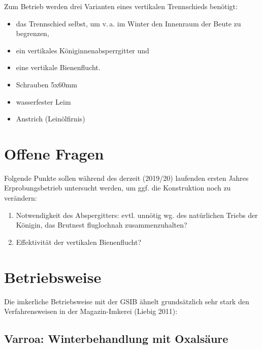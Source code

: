 \documentclass[12pt,a4paper,ngerman]{scrartcl}
\begin{document}
Zum Betrieb werden drei Varianten eines vertikalen Trennschieds benötigt:

\begin{itemize}
\item das Trennschied selbst, um v.\,a. im Winter den Innenraum der Beute zu begrenzen,
\item ein vertikales Königinnenabsperrgitter und
\item eine vertikale Bienenflucht.
\end{itemize}



\begin{itemize}
\item Schrauben 5x60mm
\item wasserfester Leim
\item Anstrich (Leinölfirnis)
\end{itemize}


\section{Offene Fragen}

Folgende Punkte sollen während des derzeit (2019/20) laufenden ersten Jahres Erprobungsbetrieb untersucht werden,
um ggf. die Konstruktion noch zu verändern:

\begin{enumerate}
\item Notwendigkeit des Abspergitters:
  evtl. unnötig wg. des natürlichen Triebs der Königin, das Brutnest fluglochnah zusammenzuhalten?
\item Effektivität der vertikalen Bienenflucht?
\end{enumerate}


\section{Betriebsweise}

Die imkerliche Betriebsweise mit der GSIB ähnelt grundsätzlich sehr stark den Verfahrensweisen in der Magazin-Imkerei (Liebig 2011):


\subsection{Varroa: Winterbehandlung mit Oxalsäure}
\end{document}
